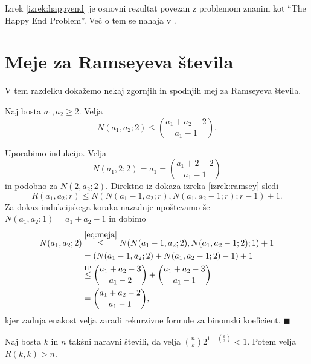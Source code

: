 \documentclass[twoside,11pt]{article}
\begin{document}
Izrek \ref{izrek:happyend} je osnovni rezultat povezan z problemom znanim 
kot ``The Happy End Problem''. Več o tem se nahaja v \cite[poglavje 29]{color}.

\section{Meje za Ramseyeva števila}

V tem razdelku dokažemo nekaj zgornjih in spodnjih mej za Ramseyeva števila.

\begin{trditev}
    Naj bosta $a_1,a_2 \ge 2$. Velja
    \[
        N(a_1, a_2; 2) \le \binom{a_1 + a_2 -2}{a_1-1}.
    \]
\end{trditev}

\begin{dokaz}
    Uporabimo indukcijo. Velja
    \[
        N(a_1, 2; 2) = a_1 = \binom{a_1+2-2}{a_1-1}
    \]
    in podobno za $N(2,a_2; 2)$. Direktno iz dokaza 
    izreka \ref{izrek:ramsey} sledi
    \begin{equation}
        R(a_1, a_2; r) \le N(N(a_1-1,a_2;r), N(a_1,a_2-1;r);r-1) + 1.
        \label{eq:meja}
    \end{equation}
    Za dokaz indukcijskega koraka nazadnje upoštevamo še $N(a_1,a_2;1) = a_1 + a_2 - 1$ in dobimo
    \begin{align*}
        N(a_1, a_2; 2) &\overset{\eqref{eq:meja}}{\le} N(N(a_1-1,a_2;2), N(a_1,a_2-1;2);1) +1\\
        &= (N(a_1-1,a_2;2) + N(a_1,a_2-1; 2) - 1) + 1 \\
        &\overset{{\text{IP}}}{\le} \binom{a_1 + a_2 -3}{a_1-2} + \binom{a_1 + a_2 -3}{a_1-1} \\
        &=\binom{a_1+a_2-2}{a_1-1},
    \end{align*}
    kjer zadnja enakost velja zaradi rekurzivne formule za binomski koeficient. \hfill $\blacksquare$
\end{dokaz} 

\begin{izrek}
    Naj bosta $k$ in $n$ takšni naravni števili, da velja 
    $\binom{n}{k}2^{1-\binom{k}{2}} < 1$. Potem velja 
    $R(k,k) > n$.
\end{izrek}
\end{document}

